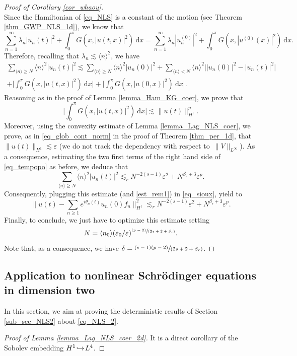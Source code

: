 \documentclass[11pt]{article}
\newcommand{\Subsection}{\subsection}
\let\epsilon\varepsilon
\newcommand\hto{\mathrel{\lhook\joinrel\to}}
\newcommand{\spfrac}[2]{\sfrac{#1}{(#2)}}
\newcommand{\pspfrac}[2]{\sfrac{(#1)}{(#2)}}
\theoremstyle{definition}
\begin{document}
\begin{proof}[Proof of Corollary \ref{cor_whaou}]
\[\]
Since the Hamiltonian of \ref{eq_NLS} is a constant of the motion (see Theorem \ref{thm_GWP_NLS_1d}), we know that
\[
\sum_{n=1}^\infty \lambda_n |u_n(t)|^2 + \int_0^\pi G(x,|u(t,x)|^2) \ \mathrm{d}x = \sum_{n=1}^\infty \lambda_n |u_n^{(0)}|^2 + \int_0^\pi G(x,|u^{(0)}(x)|^2) \ \mathrm{d}x.
\]
Therefore, recalling that $\lambda_n \lesssim \langle n \rangle^2$, we have
\begin{multline}
\label{eq_tempopo}
\sum_{\langle n \rangle \geq N} \langle n \rangle^2 |u_n(t)|^2 \lesssim \sum_{\langle n \rangle \geq N} \langle n \rangle^2 |u_n(0)|^2 + \sum_{\langle n \rangle < N } \langle n \rangle^2 \bigl||u_n(0)|^2 - |u_n(t)|^2 \bigl| \\
+ \biggl| \int_0^\pi G(x,|u(t,x)|^2) \ \mathrm{d}x \biggr| + \biggl| \int_0^\pi G(x,|u(0,x)|^2) \ \mathrm{d}x \biggr|.
\end{multline}
Reasoning as in the proof of Lemma \ref{lemma_Ham_KG_coer}, we prove that
\[
\biggl| \int_0^\pi G(x,|u(t,x)|^2) \ \mathrm{d}x \biggl| \lesssim \| u(t) \|_{H^1}^p.
\]
Moreover, using the convexity estimate of Lemma \ref{lemma_Lag_NLS_coer}, we prove, as in \eqref{eq_glob_cont_norm} in the proof of Theorem \ref{thm_per_1d}, that $\|u(t)\|_{H^1}\lesssim \varepsilon$ (we do not track the dependency with respect to~$\|V\|_{L^\infty}$). As a consequence, estimating the two first terms of the right hand side of \eqref{eq_tempopo} as before, we deduce that
\[
\sum_{\langle n \rangle \geq N} \langle n \rangle^2 |u_n(t)|^2 \lesssim_r N^{-2(s-1)} \varepsilon^2 + N^{\beta_r+3} \varepsilon^p.
\]
Consequently, plugging this estimate (and \eqref{est_rem1}) in \eqref{eq_sioux}, yield to
\[
\biggl\| u(t) - \sum_{n\geq 1} e^{i\theta_n(t)} u_n(0) f_n \biggr\|_{H^1}^2 \lesssim_r N^{-2(s-1)} \varepsilon^2 + N^{\beta_r+3} \varepsilon^p.
\]
Finally, to conclude, we just have to optimize this estimate setting
\[
N =\langle n_0\rangle (\epsilon_0/\varepsilon)^{\pspfrac{p-2}{2s+2+\beta_r}}.
\]
Note that, as a consequence, we have $\delta = \spfrac{(s-1)(p-2)}{2s+2+\beta_r}$.
\end{proof}

\Subsection{Application to nonlinear Schrödinger equations in dimension two}
\label{sec_NLS_2d}

In this section, we aim at proving the deterministic results of Section \ref{sub_sec_NLS2} about \eqref{eq_NLS_2}.

\begin{proof}[Proof of Lemma \ref{lemma_Lag_NLS_coer_2d}] It is a direct corollary of the Sobolev embedding $H^1\!\hto\!L^4$.
\end{proof}
\end{document}
